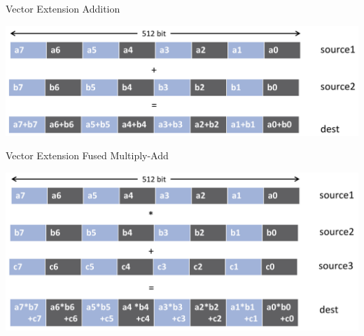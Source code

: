 \begin{frame}{Vector Extension Addition}
\begin{center}
\includegraphics[width=\textwidth]{figures/vector_widths_2.pdf}
\end{center}
\end{frame}

\begin{frame}{Vector Extension Fused Multiply-Add}
\begin{center}
\includegraphics[width=\textwidth]{figures/vector_widths_3.pdf}
\end{center}
\end{frame}


